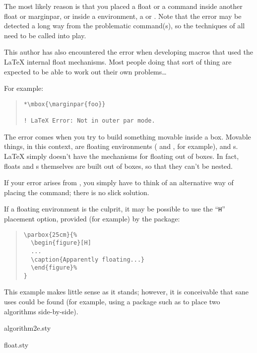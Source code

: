 {The most likely reason is that you placed a float or a 
command inside another float or marginpar, or inside a
 environment, a  or .
Note that the error may be detected a long way from the problematic
command(s), so the techniques of %
 all need to be
called into play.

This author has also encountered the error when developing macros that
used the \LaTeX{} internal float mechanisms.  Most people doing that
sort of thing are expected to be able to work out their own problems\dots{}


For example:
\begin{quote}
\begin{verbatim}
*\mbox{\marginpar{foo}}

! LaTeX Error: Not in outer par mode.
\end{verbatim}
\end{quote}
The error comes when you try to build something movable inside a box.
Movable things, in this context, are floating environments
( and , for example), and
s.  \LaTeX{} simply doesn't have the mechanisms for
floating out of boxes.  In fact, floats and s
themselves are built out of boxes, so that they can't be nested.

If your error arises from , you simply have to think of
an alternative way of placing the command; there is no slick solution.

If a floating environment is the culprit, it may be possible to use
the ``\texttt{H}'' placement option, provided (for example) by the
 package:
\begin{quote}
\begin{verbatim}
\parbox{25cm}{%
  \begin{figure}[H]
  ...
  \caption{Apparently floating...}
  \end{figure}%
}
\end{verbatim}
\end{quote}
This example makes little sense as it stands; however, it is
conceivable that sane uses could be found (for example, using a
package such as  to place two algorithms
side-by-side).
\begin{ctanrefs}
\item[algorithm2e.sty]
\item[float.sty]
\end{ctanrefs}

}
